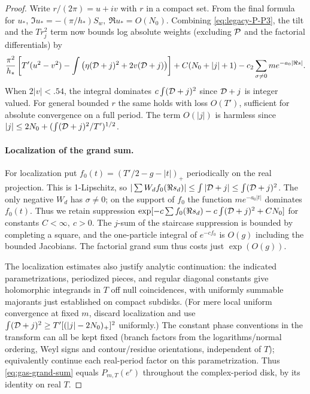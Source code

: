 \begin{proof}
Write \(r/(2\pi)=u+i v\) with \(r\) in a compact set. From the final formula for \(u_*\), \(\Im u_*=-(\pi/h_*)S_w,\ \Re u_*=O(N_0)\). Combining \eqref{eq:legacy-P-P3}, the tilt and the \(T r_j^2\) term now bounds log absolute weights (excluding \({\cal P}\) and the factorial differentials) by
\[
 \frac{\pi^2}{h_*}
 \left[T'(u^2-v^2)-\int\big(\eta({\cal D}+j)^2+2v({\cal D}+j)\big)\right]
 + C(N_0+|j|+1) - c_2\sum_{\sigma\ne0}m e^{-a_0|\Re s|}.
\]
When \(2|v|<.54\), the integral dominates \(c\int({\cal D}+j)^2\) since \({\cal D}+j\) is integer valued. For general bounded \(r\) the same holds with loss \(O(T')\), sufficient for absolute convergence on a full period. The term \(O(|j|)\) is harmless since \(|j|\le 2N_0+(\int({\cal D}+j)^2/T')^{1/2}\).

\paragraph{Localization of the grand sum.}
\label{gas:grand-localization}
For localization put \(f_0(t)=(T'/2-g-|t|)_+\) periodically on the real projection. This is 1-Lipschitz, so \(|\sum W_d f_0(\Re s_d)|\le\int|{\cal D}+j|\le\int({\cal D}+j)^2\). The only negative \(W_d\) has \(\sigma\ne0\); on the support of \(f_0\) the function \(m e^{-a_0|t|}\) dominates \(f_0(t)\). Thus we retain suppression \(\exp[-c\sum f_0(\Re s_d)-c\int({\cal D}+j)^2+C N_0]\) for constants \(C<\infty,\ c>0\). The \(j\)-sum of the staircase suppression is bounded by completing a square, and the one-particle integral of \(e^{-c f_0}\) is \(O(g)\) including the bounded Jacobians. The factorial grand sum thus costs just \(\exp(O(g))\).

The localization estimates also justify analytic continuation: the indicated parametrizations, periodized pieces, and regular diagonal constants give holomorphic integrands in \(T\) off null coincidences, with uniformly summable majorants just established on compact subdisks. (For mere local uniform convergence at fixed \(m\), discard localization and use \(\int({\cal D}+j)^2\ge T'[(|j|-2N_0)_+]^2\) uniformly.) The constant phase conventions in the transform can all be kept fixed (branch factors from the logarithms/normal ordering, Weyl signs and contour/residue orientations, independent of \(T\)); equivalently continue each real-period factor on this parametrization. Thus \eqref{eq:gas-grand-sum} equals \(P_{m,T}(e^r)\) throughout the complex-period disk, by its identity on real \(T\).


\end{proof}
